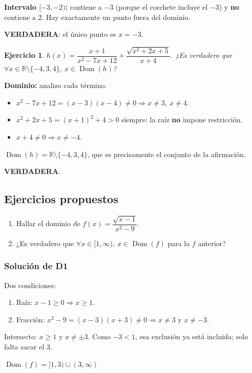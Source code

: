 \documentclass[11pt,a4paper]{article}
\theoremstyle{ej}
\newtheorem{ejercicio}{Ejercicio}[section]
\newcommand{\R}{\mathbb{R}}
\newcommand{\dom}{\operatorname{Dom}}
\begin{document}
\textbf{Intervalo $[-3,-2)$:} contiene a $-3$ (porque el corchete incluye el $-3$) y \textbf{no} contiene a $2$.
Hay exactamente un punto fuera del dominio.
\begin{respuesta}
\textbf{VERDADERA}: el único punto es $x=-3$.
\end{respuesta}

\begin{ejercicio}
$h(x)=\dfrac{x+1}{x^2-7x+12}+\dfrac{\sqrt{x^2+2x+5}}{x+4}$. ¿Es verdadero que $\forall x\in\R\setminus\{-4,3,4\},\ x\in\dom(h)$?
\end{ejercicio}

\textbf{Dominio:} analizo cada término.
\begin{itemize}[nosep]
  \item $x^2-7x+12=(x-3)(x-4)\ne0\Rightarrow x\ne3,\ x\ne4$.
  \item $x^2+2x+5=(x+1)^2+4>0$ siempre: la raíz \textbf{no} impone restricción.
  \item $x+4\ne0\Rightarrow x\ne-4$.
\end{itemize}
$\dom(h)=\R\setminus\{-4,3,4\}$, que es precisamente el conjunto de la afirmación.
\begin{respuesta}
\textbf{VERDADERA}.
\end{respuesta}

\subsection{Ejercicios propuestos}
\begin{enumerate}[label=\textbf{D\arabic*.}]
  \item Hallar el dominio de $f(x)=\dfrac{\sqrt{x-1}}{x^2-9}$.
  \item ¿Es verdadero que $\forall x\in[1,\infty),\ x\in\dom(f)$ para la $f$ anterior?
\end{enumerate}
\subsubsection*{Solución de D1}
Dos condiciones:
\begin{enumerate}[nosep]
  \item Raíz: $x-1\ge0\Rightarrow x\ge1$.
  \item Fracción: $x^2-9=(x-3)(x+3)\ne0\Rightarrow x\ne3$ y $x\ne-3$.
\end{enumerate}
Intersecto: $x\ge1$ y $x\ne\pm3$. Como $-3<1$, esa exclusión ya está incluida; solo falta sacar el $3$.
\begin{respuesta}$\dom(f)=[1,3)\cup(3,\infty)$\end{respuesta}
\end{document}
